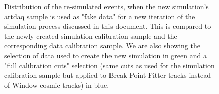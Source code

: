 \begin{figure}[!ht]

\caption{Distribution of the re-simulated events, when the new simulation's artdaq sample is used as "fake data" for a new iteration of the simulation process discussed in this document. This is compared to the newly created simulation calibration sample and the corresponding data calibration sample. We are also showing the selection of data used to create the new simulation in green and a "full calibration cuts" selection (same cuts as used for the simulation calibration sample but applied to Break Point Fitter tracks instead of Window cosmic tracks) in blue.}
\label{figSimVersionComparison}
\end{figure}

